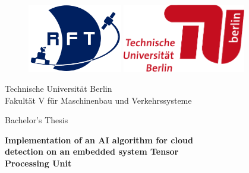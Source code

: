 
\begin{titlepage}
\thispagestyle{empty} %

\rmfamily

\vspace*{-1.5cm}

\begin{figure}[ht]
\centering
\begin{minipage}{0.45\textwidth}
    \centering
    \includegraphics[height=30mm]{files/RFT_Logo}
\end{minipage}%
\hfill
\begin{minipage}{0.45\textwidth}
    \centering
    \includegraphics[height=30mm]{files/TU_Logo_lang_RGB_rot}
\end{minipage}
\end{figure}

\vspace{2.5cm}

\begin{center}
    Technische Universität Berlin\\
    Fakultät V für Maschinenbau und Verkehrssysteme

    \vspace{2cm}

    Bachelor's Thesis

    \vspace{1.5cm}

    \begin{spacing}{1.3}
    \textbf{\LARGE
        Implementation of an AI algorithm for cloud\\
        detection on an embedded system Tensor\\
        Processing Unit\\}
    \end{spacing}


\end{center}
\end{titlepage}
